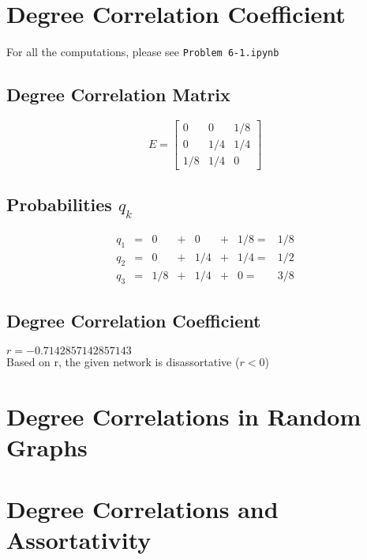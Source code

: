 \documentclass {article}
\begin{document}
\section{Degree Correlation Coefficient}
For all the computations, please see \texttt{Problem 6-1.ipynb}
\subsection{Degree Correlation Matrix}
\[
 	E = 
 	\left[ {\begin{array}{ccc}
 	0     &  0   & 1/8 \\
 	0     & 1/4 & 1/4 \\
  	1/8  & 1/4 & 0
 	\end{array}} \right]
\]

\subsection{Probabilities $q_k$}
\[{
\begin{array}{cccccccc}
q_1 &=& 0&+&0&+&1/8 =&1/8 \\
q_2 &=& 0&+&1/4&+&1/4 =&1/2 \\
q_3 &=& 1/8&+&1/4&+&0 =&3/8 
\end{array}
}\]
\subsection{Degree Correlation Coefficient}
$r = -0.7142857142857143$\\

Based on r, the given network is disassortative ($r < 0$)
\newpage

\section{Degree Correlations in Random Graphs}
\newpage

\section{Degree Correlations and Assortativity}
\end{document}
